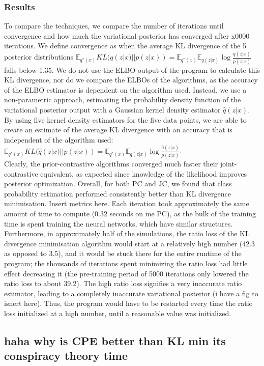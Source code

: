 \documentclass[a4paper,12pt]{article}
\newcommand{\E}{\mathbb{E}}
\numberwithin{equation}{section}
\begin{document}
\subsubsection{Results}
To compare the techniques, we compare the number of iterations until convergence and how much the variational posterior has converged after x0000 iterations. We define convergence as when the average KL divergence of the 5 posterior distributions $\E_{q^*(x)}KL(q(z|x)||p(z|x)) = \E_{q^*(x)}\E_{q(z|x)}\log \frac{q(z|x)}{p(z|x)}$ falls below 1.35. We do not use the ELBO output of the program to calculate this KL divergence, nor do we compare the ELBOs of the algorithms, as the accuracy of the ELBO estimator is dependent on the algorithm used. Instead, we use a non-parametric approach, estimating the probability density function of the variational posterior output with a Gaussian kernel density estimator $\hat{q}(z|x)$. By using five kernel density estimators for the five data points, we are able to create an estimate of the average KL divergence with an accuracy that is independent of the algorithm used: $\E_{q^*(x)}KL(\hat{q}(z|x)||p(z|x)) = \E_{q^*(x)}\E_{q(z|x)}\log \frac{\hat{q}(z|x)}{p(z|x)}$.\\
Clearly, the prior-contrastive algorithms converged much faster their joint-contrastive equivalent, as expected since knowledge of the likelihood improves posterior optimization. Overall, for both PC and JC, we found that class probability estimation performed consistently better than KL divergence minimisation. Insert metrics here. Each iteration took approximately the same amount of time to compute (0.32 seconds on me PC), as the bulk of the training time is spent training the neural networks, which have similar structures.\\
Furthermore, in approximately half of the simulations, the ratio loss of the KL divergence minimisation algorithm would start at a relatively high number (42.3 as opposed to 3.5), and it would be stuck there for the entire runtime of the program; the thousands of iterations spent minimizing the ratio loss had little effect decreasing it (the pre-training period of 5000 iterations only lowered the ratio loss to about 39.2). The high ratio loss signifies a very inaccurate ratio estimator, leading to a completely inaccurate variational posterior (i have a fig to isnert here). Thus, the program would have to be restarted every time the ratio loss initialized at a high number, until a reasonable value was initialized. 
\newpage
\subsection{haha why is CPE better than KL min its conspiracy theory time}
\end{document}

